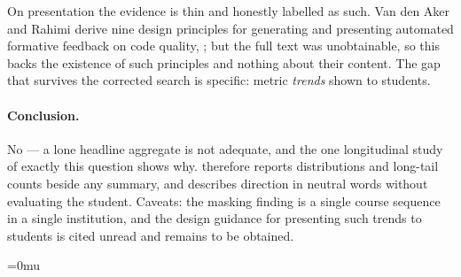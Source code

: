 On presentation the evidence is thin and honestly labelled as such.  Van den
Aker and Rahimi derive nine design principles for generating and presenting
automated formative feedback on code quality,
; but the full text was unobtainable, so
this backs
the existence of such principles and nothing about their content.  The gap
that survives the corrected search is specific: metric \emph{trends} shown
to students.

\paragraph{Conclusion.}
No --- a lone headline aggregate is not adequate, and the one longitudinal
study of exactly this question shows why.  
therefore reports distributions and long-tail counts beside any summary, and
describes direction in neutral words without evaluating the student.
Caveats: the masking finding is a single course sequence in a single
institution, and the design guidance for presenting such trends to students
is cited unread and remains to be obtained.

\makeatletter
\def\do@url@hyp{}
\makeatother
\Urlmuskip=0mu\relax

